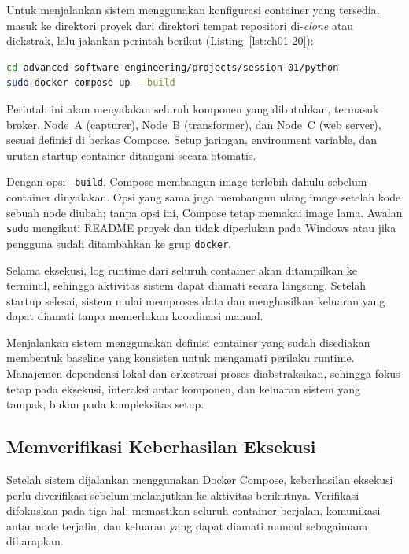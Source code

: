 Untuk menjalankan sistem menggunakan konfigurasi container yang tersedia, masuk
ke direktori proyek dari direktori tempat repositori di-\emph{clone} atau
diekstrak, lalu jalankan perintah berikut (Listing~\ref{lst:ch01-20}):

\begin{lstlisting}[language=bash, caption={Berpindah ke direktori proyek dan menjalankan sistem}, label={lst:ch01-20}]
cd advanced-software-engineering/projects/session-01/python
sudo docker compose up --build
\end{lstlisting}

Perintah ini akan menyalakan seluruh komponen yang dibutuhkan, termasuk broker,
Node~A (capturer), Node~B (transformer), dan Node~C (web server), sesuai definisi
di berkas Compose. Setup jaringan, environment variable, dan urutan startup
container ditangani secara otomatis.

Dengan opsi \texttt{--build}, Compose membangun image terlebih dahulu sebelum
container dinyalakan. Opsi yang sama juga membangun ulang image setelah kode
sebuah node diubah; tanpa opsi ini, Compose tetap memakai image lama. Awalan \texttt{sudo}
mengikuti README proyek dan tidak diperlukan pada Windows atau jika pengguna
sudah ditambahkan ke grup \texttt{docker}.

Selama eksekusi, log runtime dari seluruh container akan ditampilkan ke terminal,
sehingga aktivitas sistem dapat diamati secara langsung. Setelah startup selesai,
sistem mulai memproses data dan menghasilkan keluaran yang dapat diamati tanpa
memerlukan koordinasi manual.

Menjalankan sistem menggunakan definisi container yang sudah disediakan membentuk baseline
yang konsisten untuk mengamati perilaku runtime. Manajemen dependensi lokal dan
orkestrasi proses diabstraksikan, sehingga fokus tetap pada eksekusi, interaksi
antar komponen, dan keluaran sistem yang tampak, bukan pada kompleksitas setup.

\subsection{Memverifikasi Keberhasilan Eksekusi}

Setelah sistem dijalankan menggunakan Docker Compose, keberhasilan eksekusi perlu
diverifikasi sebelum melanjutkan ke aktivitas berikutnya. Verifikasi difokuskan
pada tiga hal: memastikan seluruh container berjalan, komunikasi antar node
terjalin, dan keluaran yang dapat diamati muncul sebagaimana diharapkan.


